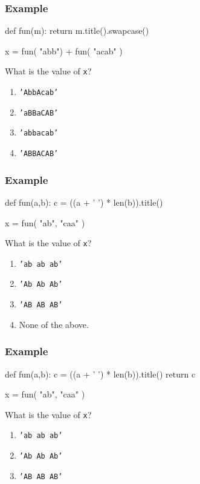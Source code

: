\documentclass[11pt]{beamer}
\begin{document}
\begin{frame}[fragile]
  \frametitle{Example}
  \Enlarge

  \begin{semiverbatim}
def fun(m):
    return m.title().swapcase()

x = fun( "abb") + fun( "acab" )
  \end{semiverbatim}
  What is the value of \texttt{x}?
  \begin{enumerate}[label=\Alph*]
  \item  \texttt{'AbbAcab'}
  \item  \texttt{'aBBaCAB'}
  \item  \texttt{'abbacab'}
  \item  \texttt{'ABBACAB'}
  \end{enumerate}
\end{frame}

\begin{frame}[fragile]
  \frametitle{Example}
  \Enlarge

  \begin{semiverbatim}
def fun(a,b):
    c = ((a + ' ') * len(b)).title()

x = fun( "ab", "caa" )
  \end{semiverbatim}
  What is the value of \texttt{x}?
  \begin{enumerate}[label=\Alph*]
  \item  \texttt{'ab ab ab'}
  \item  \texttt{'Ab Ab Ab'}
  \item  \texttt{'AB AB AB'}
  \item  None of the above.
  \end{enumerate}
\end{frame}

\begin{frame}[fragile]
  \frametitle{Example}
  \Enlarge

  \begin{semiverbatim}
def fun(a,b):
    c = ((a + ' ') * len(b)).title()
    return c

x = fun( "ab", "caa" )
  \end{semiverbatim}
  What is the value of \texttt{x}?
  \begin{enumerate}[label=\Alph*]
  \item  \texttt{'ab ab ab'}
  \item  \texttt{'Ab Ab Ab'}
  \item  \texttt{'AB AB AB'}
  \end{enumerate}
\end{frame}
\end{document}
